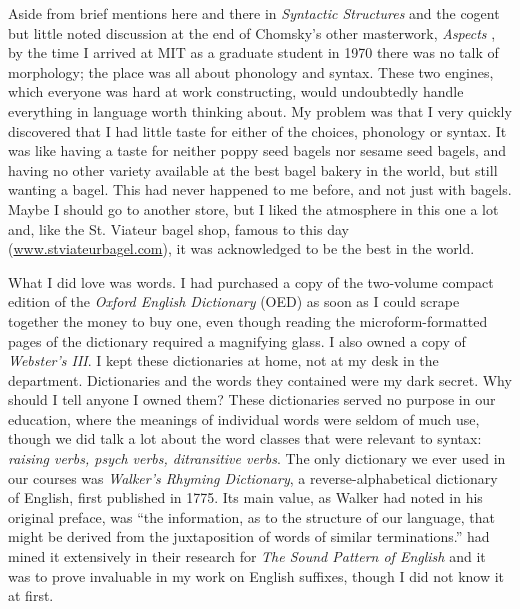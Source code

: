 \documentclass[output=paper]{langsci/langscibook}
\begin{document}
Aside from brief mentions here and there in \emph{Syntactic Structures}
and the cogent but little noted discussion at the end of Chomsky's other
masterwork, \emph{Aspects} %
\citep{Chomsky1965}%
%
, by the time I arrived at MIT
as a graduate student in 1970 there was no talk of morphology; the place
was all about phonology and syntax. These two engines, which everyone
was hard at work constructing, would undoubtedly handle everything in
language worth thinking about. My problem was that I very quickly
discovered that I had little taste for either of the choices, phonology
or syntax. It was like having a taste for neither poppy seed bagels nor
sesame seed bagels, and having no other variety available at the best
bagel bakery in the world, but still wanting a bagel. This had never
happened to me before, and not just with bagels. Maybe I should go to
another store, but I liked the atmosphere in this one a lot and, like
the St. Viateur bagel shop, famous to this day
(\href{http://www.stviateurbagel.com}{www.stviateurbagel.com}), it was
acknowledged to be the best in the world.

What I did love was words. I had purchased a copy of the two-volume
compact edition of the \emph{Oxford English Dictionary} (OED) as soon as
I could scrape together the money to buy one, even though reading the
microform-formatted pages of the dictionary required a magnifying glass.
I also owned a copy of \emph{Webster's III}. I kept these dictionaries
at home, not at my desk in the department. Dictionaries and the words
they contained were my dark secret. Why should I tell anyone I owned
them? These dictionaries served no purpose in our education, where the
meanings of individual words were seldom of much use, though we did talk
a lot about the word classes that were relevant to syntax: \emph{raising
verbs, psych verbs, ditransitive verbs}. The only dictionary we ever
used in our courses was \emph{Walker's Rhyming Dictionary}, a
reverse-alphabetical dictionary of English, first published in 1775. Its
main value, as Walker had noted in his original preface, was ``the
information, as to the structure of our language, that might be derived
from the juxtaposition of words of similar terminations.'' 
\citeauthor{Chomsky68} %
%
%
had mined it extensively in their research for \emph{The Sound
Pattern of English} and it was to prove invaluable in my work on English
suffixes, though I did not know it at first.
\end{document}
